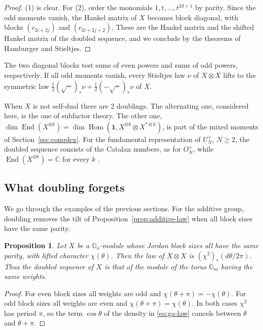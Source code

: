 \documentclass[11pt,reqno]{amsart}
\newtheorem{proposition}[theorem]{Proposition}
\theoremstyle{definition}
\newcommand{\Hom}{\operatorname{Hom}}
\newcommand{\End}{\operatorname{End}}
\newcommand{\one}{\mathbf 1}
\newcommand{\CC}{\mathbb C}
\newcommand{\Ga}{\mathbb G_a}
\newcommand{\Gm}{\mathbb G_m}
\begin{document}
\begin{proof}
(1) is clear. For (2), order the monomials $1,t,\ldots,t^{2d+1}$ by parity. Since the odd moments vanish, the Hankel matrix of $X$ becomes block diagonal, with blocks $(c_{2i+2j})$ and $(c_{2i+2j+2})$. These are the Hankel matrix and the shifted Hankel matrix of the doubled sequence, and we conclude by the theorems of Hamburger and Stieltjes.
\end{proof}

The two diagonal blocks test sums of even powers and sums of odd powers, respectively. If all odd moments vanish, every Stieltjes law $\nu$ of $X\otimes X$ lifts to the symmetric law $\frac12(\sqrt{\,\cdot\,})_*\nu+\frac12(-\sqrt{\,\cdot\,})_*\nu$ of $X$.

When $X$ is not self-dual there are 2 doublings. The alternating one, considered here, is the one of subfactor theory. The other one, $\dim\End(X^{\otimes k})=\dim\Hom(\one,X^{\otimes k}\otimes X^{*\otimes k})$, is part of the mixed moments of Section~\ref{sec:complex}. For the fundamental representation of $U_N^+$, $N\geq2$, the doubled sequence consists of the Catalan numbers, as for $O_N^+$, while $\End(X^{\otimes k})=\CC$ for every $k$ \cite{BanU}.

\subsection{What doubling forgets}
We go through the examples of the previous sections. For the additive group, doubling removes the tilt of Proposition~\ref{prop:additive-law} when all block sizes have the same parity.

\begin{proposition}\label{prop:doubling-ga}
Let $X$ be a $\Ga$-module whose Jordan block sizes all have the same parity, with lifted character $\chi(\theta)$. Then the law of $X\otimes X$ is $(\chi^2)_*(d\theta/2\pi)$. Thus the doubled sequence of $X$ is that of the module of the torus $\Gm$ having the same weights.
\end{proposition}

\begin{proof}
For even block sizes all weights are odd and $\chi(\theta+\pi)=-\chi(\theta)$. For odd block sizes all weights are even and $\chi(\theta+\pi)=\chi(\theta)$. In both cases $\chi^2$ has period $\pi$, so the term $\cos\theta$ of the density in \eqref{eq:ga-law} cancels between $\theta$ and $\theta+\pi$.
\end{proof}
\end{document}

